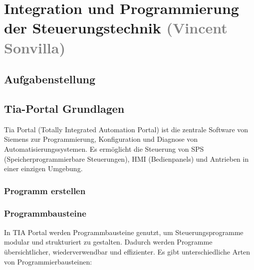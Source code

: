 \section{Integration und Programmierung der Steuerungstechnik \textcolor{gray}{ (Vincent Sonvilla)}}


\subsection{Aufgabenstellung}

\subsection{Tia-Portal Grundlagen}

Tia Portal (Totally Integrated Automation Portal) ist die zentrale Software von Siemens zur Programmierung, Konfiguration und Diagnose von Automatisierungssystemen. Es ermöglicht die Steuerung von SPS (Speicherprogrammierbare Steuerungen), HMI (Bedienpanels) und Antrieben in einer einzigen Umgebung.

    \subsubsection{Programm erstellen}

    \subsubsection{Programmbausteine}
    
    In TIA Portal werden Programmbausteine genutzt, um Steuerungsprogramme modular und strukturiert zu gestalten. Dadurch werden Programme übersichtlicher, wiederverwendbar und effizienter. Es gibt unterschiedliche Arten von Programmierbausteinen:


